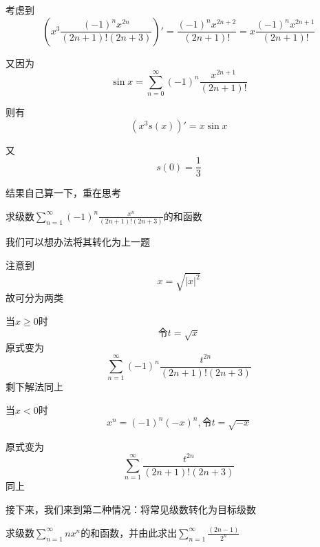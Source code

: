 \documentclass[lang=cn,10pt]{elegantbook}
\begin{document}
		考虑到
		\begin{equation*}
			(x^{3}\frac{(-1)^{n}x^{2n}}{(2n+1)!(2n+3)})'=\frac{(-1)^{n}x^{2n+2}}{(2n+1)!}=x\frac{(-1)^{n}x^{2n+1}}{(2n+1)!}
		\end{equation*}
		
		又因为
		\begin{equation*}
			\sin x =\sum_{n=0}^{\infty }(-1)^{n}\frac{x^{2n+1} }{(2n+1)!}
		\end{equation*}
		
		则有
		\begin{equation*}
			(x^{3}s(x))'=x\sin x
		\end{equation*}
		
		又
		\begin{equation*}
			s(0)=\frac{1}{3}
		\end{equation*}
		
		结果自己算一下，重在思考
		
		\begin{example}
			求级数$\sum_{n=1}^{\infty }(-1)^{n}\frac{x^{n}}{(2n+1)!(2n+3)}$的和函数
		\end{example}
		
		我们可以想办法将其转化为上一题
		
		注意到
		\begin{equation*}
			x=\sqrt{|x|^{2}}
		\end{equation*}
		故可分为两类
		
		当$x\ge0$时
		\begin{equation*}
			令t=\sqrt{x}
		\end{equation*}
		原式变为
		\begin{equation*}
			\sum_{n=1}^{\infty }(-1)^{n}\frac{t^{2n}}{(2n+1)!(2n+3)}
		\end{equation*}
		剩下解法同上
		
		当$x<0$时
		\begin{equation*}
			x^{n}=(-1)^{n}(-x)^{n},令t=\sqrt{-x}
		\end{equation*}
		
		原式变为
		\begin{equation*}
			\sum_{n=1}^{\infty }\frac{t^{2n}}{(2n+1)!(2n+3)}
		\end{equation*}
		同上
		
	接下来，我们来到第二种情况：将常见级数转化为目标级数
		\begin{example}
			求级数$\sum_{n=1}^{\infty }nx^{n} $的和函数，并由此求出$\sum_{n=1}^{\infty }\frac{(2n-1)}{2^{n}} $
		\end{example}
		
\end{document}
